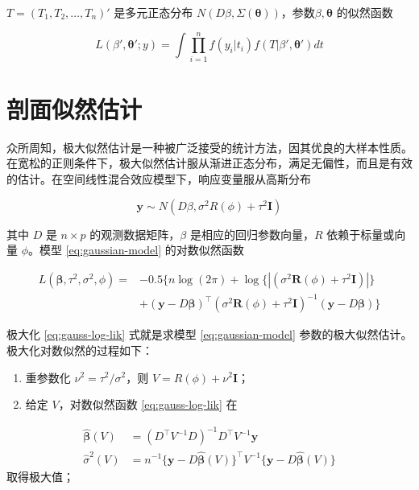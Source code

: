 \documentclass[12pt,a4paper,UTF8,twoside]{book}
\theoremstyle{definition}
\theoremstyle{definition}
\theoremstyle{definition}
\theoremstyle{remark}
\begin{document}
\(T = (T_1,T_2,\ldots,T_n)'\) 是多元正态分布
\(N(D\beta,\Sigma(\boldsymbol{\theta}))\)，参数\(\beta,\boldsymbol{\theta}\)
的似然函数

\begin{equation}
L(\beta',\boldsymbol{\theta}';y) = \int \prod_{i=1}^{n}f(y_i|t_i)f(T|\beta',\boldsymbol{\theta}')dt \label{eq:likelihood-function}
\end{equation}

\hypertarget{profile-likelihood}{%
\section{剖面似然估计}\label{profile-likelihood}}

众所周知，极大似然估计是一种被广泛接受的统计方法，因其优良的大样本性质。在宽松的正则条件下，极大似然估计服从渐进正态分布，满足无偏性，而且是有效的估计。在空间线性混合效应模型下，响应变量服从高斯分布

\begin{equation}
\mathbf{y} \sim N(D\beta,\sigma^2 R(\phi) + \tau^2\mathbf{I})
\label{eq:gaussian-model}
\end{equation}

其中 \(D\) 是 \(n \times p\) 的观测数据矩阵，\(\beta\)
是相应的回归参数向量，\(R\) 依赖于标量或向量 \(\phi\)。模型
\eqref{eq:gaussian-model} 的对数似然函数

\begin{equation}
\begin{aligned}
L(\boldsymbol{\beta},\tau^2,\sigma^2,\phi) = {} 
 & - 0.5\{ n\log(2\pi) + \log\{|(\sigma^2\mathbf{R}(\phi)+\tau^2\mathbf{I})|\} \\
 & + (\mathbf{y} - D\boldsymbol{\beta})^{\top}(\sigma^2\mathbf{R}(\phi)+\tau^2\mathbf{I})^{-1}(\mathbf{y} - D\boldsymbol{\beta}) \}  
\end{aligned} \label{eq:gauss-log-lik}
\end{equation}

极大化 \eqref{eq:gauss-log-lik} 式就是求模型 \eqref{eq:gaussian-model}
参数的极大似然估计。极大化对数似然的过程如下：

\begin{enumerate}
\def\labelenumi{\arabic{enumi}.}
\item
  重参数化 \(\nu^2 = \tau^2/\sigma^2\)，则
  \(V = R(\phi) + \nu^2 \mathbf{I}\)；
\item
  给定 \(V\)，对数似然函数 \eqref{eq:gauss-log-lik} 在
\end{enumerate}

\begin{equation}
  \begin{aligned}
  \hat{\boldsymbol{\beta}}(V) & =  (D^{\top} V^{-1} D)^{-1} D^{\top} V^{-1}\mathbf{y} \\
  \hat{\sigma}^2(V)           & =  n^{-1} \{\mathbf{y} - D\hat{\boldsymbol{\beta}}(V)\}^{\top} V^{-1} \{\mathbf{y} - D\hat{\boldsymbol{\beta}}(V)\}
  \end{aligned} \label{eq:beta-sigma}
  \end{equation} 取得极大值；
\end{document}
